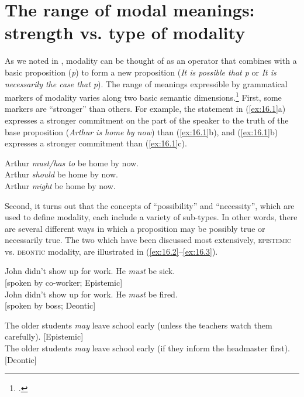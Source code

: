 \section{The range of modal meanings: strength vs. type of modality}\label{sec:16.2}

As we noted in , modality can be thought of as an operator that combines with a basic proposition (\textit{p}) to form a new proposition (\textit{It is possible that p} or \textit{It is necessarily the case that p}). The range of meanings expressible by grammatical markers of modality varies along two basic semantic dimensions.\footnote{\citet{Hacquard2011}.} First, some markers are “stronger” than others. For example, the statement in (\ref{ex:16.1}a) expresses a stronger commitment on the part of the speaker to the truth of the base proposition (\textit{Arthur is home by now}) than (\ref{ex:16.1}b), and (\ref{ex:16.1}b) expresses a stronger commitment than (\ref{ex:16.1}c).


\ea \label{ex:16.1}
\ea  Arthur \textit{must/has to} be home by now.\\
\ex Arthur \textit{should} be home by now.\\
\ex Arthur \textit{might} be home by now.
                       \z
\z


Second, it turns out that the concepts of “possibility” and “necessity”, which are used to define modality, each include a variety of sub-types. In other words, there are several different ways in which a proposition may be possibly true or necessarily true. The two which have been discussed most extensively, \textsc{epistemic} vs. \textsc{deontic} modality, are illustrated in (\ref{ex:16.2}--\ref{ex:16.3}).


\ea \label{ex:16.2}
\ea  John didn’t show up for work. He \textit{must} be sick. \\ \hfill [spoken by co-worker; Epistemic]\\
\ex John didn’t show up for work. He \textit{must} be fired.  \\  \hfill [spoken by boss; Deontic]
                       \z
\z

\ea \label{ex:16.3}
\ea  The older students \textit{may} leave school early (unless the teachers watch them carefully). \hfill [Epistemic]\\
\ex The older students \textit{may} leave school early (if they inform the headmaster first). \hfill [Deontic]
                       \z
\z


